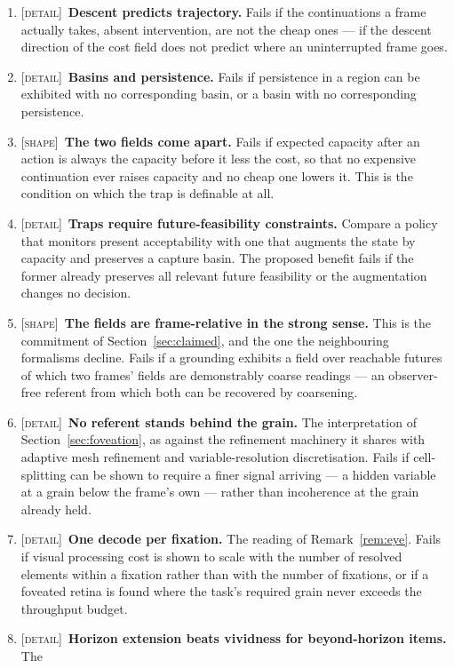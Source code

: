 \documentclass[11pt,a4paper]{article}
\theoremstyle{remark}
\begin{document}
\begin{enumerate}[leftmargin=*]
\item \textsc{[detail]}~\textbf{Descent predicts trajectory.} Fails if the continuations a frame actually takes, absent intervention, are not the cheap ones --- if the descent direction of the cost field does not predict where an uninterrupted frame goes.
\item \textsc{[detail]}~\textbf{Basins and persistence.} Fails if persistence in a region can be exhibited with no corresponding basin, or a basin with no corresponding persistence.
\item \textsc{[shape]}~\textbf{The two fields come apart.} Fails if expected capacity after an action is always the capacity before it less the cost, so that no expensive continuation ever raises capacity and no cheap one lowers it. This is the condition on which the trap is definable at all.
\item \textsc{[detail]}~\textbf{Traps require future-feasibility constraints.} Compare a policy
that monitors present acceptability with one that augments the state by capacity
and preserves a capture basin. The proposed benefit fails if the former already
preserves all relevant future feasibility or the augmentation changes no decision.
\item \textsc{[shape]}~\textbf{The fields are frame-relative in the strong sense.} This is the
commitment of Section~\ref{sec:claimed}, and the one the neighbouring formalisms decline. Fails if a
grounding exhibits a field over reachable futures of which two frames' fields are demonstrably coarse
readings --- an observer-free referent from which both can be recovered by coarsening.
\item \textsc{[detail]}~\textbf{No referent stands behind the grain.} The interpretation of
Section~\ref{sec:foveation}, as against the refinement machinery it shares with adaptive mesh
refinement and variable-resolution discretisation. Fails if cell-splitting can be shown to require a
finer signal arriving --- a hidden variable at a grain below the frame's own --- rather than
incoherence at the grain already held.
\item \textsc{[detail]}~\textbf{One decode per fixation.} The reading of
Remark~\ref{rem:eye}. Fails if visual processing cost is shown to scale with the number of
resolved elements within a fixation rather than with the number of fixations, or if a
foveated retina is found where the task's required grain never exceeds the throughput
budget.
\item \textsc{[detail]}~\textbf{Horizon extension beats vividness for beyond-horizon items.} The

\end{enumerate}
\end{document}

